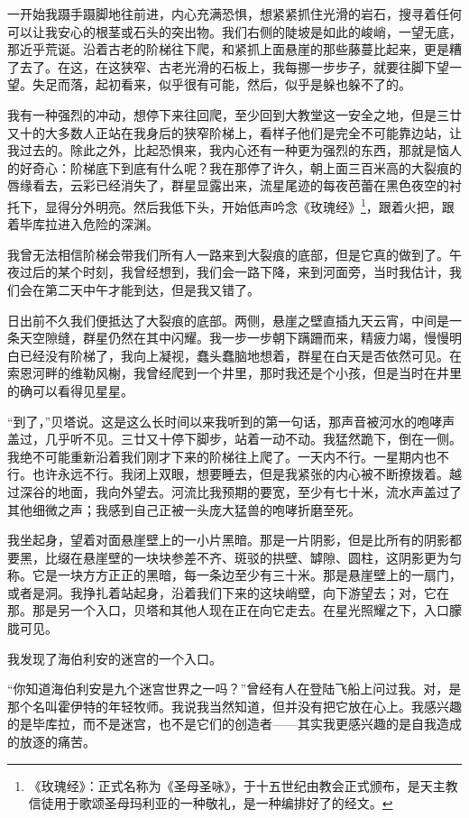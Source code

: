 \documentclass[AutoFakeBold=true]{book}
\begin{document}
一开始我蹑手蹑脚地往前进，内心充满恐惧，想紧紧抓住光滑的岩石，搜寻着任何可以让我安心的根茎或石头的突出物。我们右侧的陡坡是如此的峻峭，一望无底，那近乎荒诞。沿着古老的阶梯往下爬，和紧抓上面悬崖的那些藤蔓比起来，更是糟了去了。在这，在这狭窄、古老光滑的石板上，我每挪一步步子，就要往脚下望一望。失足而落，起初看来，似乎很有可能，然后，似乎是躲也躲不了的。

我有一种强烈的冲动，想停下来往回爬，至少回到大教堂这一安全之地，但是三廿又十的大多数人正站在我身后的狭窄阶梯上，看样子他们是完全不可能靠边站，让我过去的。除此之外，比起恐惧来，我内心还有一种更为强烈的东西，那就是恼人的好奇心：阶梯底下到底有什么呢？我在那停了许久，朝上面三百米高的大裂痕的唇缘看去，云彩已经消失了，群星显露出来，流星尾迹的每夜芭蕾在黑色夜空的衬托下，显得分外明亮。然后我低下头，开始低声吟念《玫瑰经》\footnote{《玫瑰经》：正式名称为《圣母圣咏》，于十五世纪由教会正式颁布，是天主教信徒用于歌颂圣母玛利亚的一种敬礼，是一种编排好了的经文。}，跟着火把，跟着毕库拉进入危险的深渊。

我曾无法相信阶梯会带我们所有人一路来到大裂痕的底部，但是它真的做到了。午夜过后的某个时刻，我曾经想到，我们会一路下降，来到河面旁，当时我估计，我们会在第二天中午才能到达，但是我又错了。

日出前不久我们便抵达了大裂痕的底部。两侧，悬崖之壁直插九天云宵，中间是一条天空隙缝，群星仍然在其中闪耀。我一步一步朝下蹒跚而来，精疲力竭，慢慢明白已经没有阶梯了，我向上凝视，蠢头蠢脑地想着，群星在白天是否依然可见。在索恩河畔的维勒风榭，我曾经爬到一个井里，那时我还是个小孩，但是当时在井里的确可以看得见星星。

``到了，''贝塔说。这是这么长时间以来我听到的第一句话，那声音被河水的咆哮声盖过，几乎听不见。三廿又十停下脚步，站着一动不动。我猛然跪下，倒在一侧。我绝不可能重新沿着我们刚才下来的阶梯往上爬了。一天内不行。一星期内也不行。也许永远不行。我闭上双眼，想要睡去，但是我紧张的内心被不断撩拨着。越过深谷的地面，我向外望去。河流比我预期的要宽，至少有七十米，流水声盖过了其他细微之声；我感到自己正被一头庞大猛兽的咆哮折磨至死。

我坐起身，望着对面悬崖壁上的一小片黑暗。那是一片阴影，但是比所有的阴影都要黑，比缀在悬崖壁的一块块参差不齐、斑驳的拱壁、罅隙、圆柱，这阴影更为匀称。它是一块方方正正的黑暗，每一条边至少有三十米。那是悬崖壁上的一扇门，或者是洞。我挣扎着站起身，沿着我们下来的这块峭壁，向下游望去；对，它在那。那是另一个入口，贝塔和其他人现在正在向它走去。在星光照耀之下，入口朦胧可见。

我发现了海伯利安的迷宫的一个入口。

``你知道海伯利安是九个迷宫世界之一吗？''曾经有人在登陆飞船上问过我。对，是那个名叫霍伊特的年轻牧师。我说我当然知道，但并没有把它放在心上。我感兴趣的是毕库拉，而不是迷宫，也不是它们的创造者——其实我更感兴趣的是自我造成的放逐的痛苦。
\end{document}
